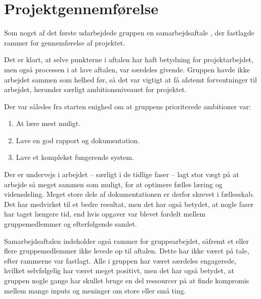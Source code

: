 \section{Projektgennemførelse}
Som noget af det første udarbejdede gruppen en samarbejdsaftale \cite{lib:Samarbejdsaftale}, der fastlagde rammer for gennemførelse af projektet. 

Det er klart, at selve punkterne i aftalen har haft betydning for projektarbejdet, men også processen i at lave aftalen, var særdeles givende. 
Gruppen havde ikke arbejdet sammen som helhed før, så det var vigtigt at få afstemt forventninger til arbejdet, herunder særligt ambitionsniveauet for projektet. 


Der var således fra starten enighed om at gruppens prioriterede ambitioner var:

\begin{enumerate}
\item At lære mest muligt.
\item Lave en god rapport og dokumentation.
\item Lave et komplekst fungerende system.
\end{enumerate}

Der er undervejs i arbejdet – særligt i de tidlige faser – lagt stor vægt på at arbejde så meget sammen som muligt, for at optimere fælles læring og vidensdeling. 
Meget store dele af dokumentationen er derfor skrevet i fællesskab. 
Det har medvirket til et bedre resultat, men det har også betydet, at nogle faser har taget længere tid, end hvis opgaver var blevet fordelt mellem gruppemedlemmer og efterfølgende samlet. 

Samarbejdsaftalen indeholder også rammer for gruppearbejdet, såfremt et eller flere gruppemedlemmer ikke levede op til aftalen. 
Dette har ikke været på tale, efter rammerne var fastlagt. 
Alle i gruppen har været særdeles engagerede, hvilket selvfølgelig har været meget positivt, men det har også betydet, at gruppen nogle gange har skullet bruge en del ressourcer på at finde kompromis mellem mange inputs og meninger om store eller små ting. 

